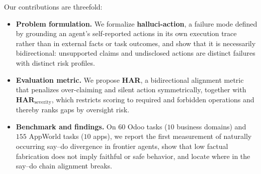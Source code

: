 Our contributions are threefold:
\begin{itemize}

\item \textbf{Problem formulation.} We formalize \textbf{halluci-action}, a
failure mode defined by grounding an agent's self-reported actions in its own
execution trace rather than in external facts or task outcomes, and show that
it is necessarily bidirectional: unsupported claims and undisclosed actions are
distinct failures with distinct risk profiles.

\item \textbf{Evaluation metric.} We propose \textbf{HAR}, a bidirectional
alignment metric that penalizes over-claiming and silent action symmetrically,
together with $\textbf{HAR}_{\text{severity}}$, which restricts scoring to
required and forbidden operations and thereby ranks gaps by oversight risk.

\item \textbf{Benchmark and findings.} On $60$ Odoo tasks ($10$ business
domains) and $155$ AppWorld tasks ($10$ apps), we report the first measurement
of naturally occurring say--do divergence in frontier agents, show that low
factual fabrication does not imply faithful or safe behavior, and locate where
in the say--do chain alignment breaks.

\end{itemize}

